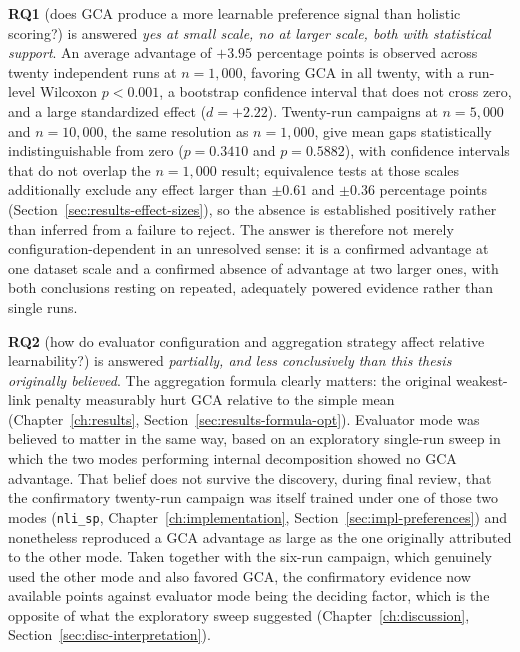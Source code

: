 \textbf{RQ1} (does GCA produce a more learnable preference signal than holistic
scoring?) is answered \emph{yes at small scale, no at larger scale, both with
statistical support}. An average advantage of $+3.95$ percentage points is
observed across twenty independent runs at $n=1{,}000$, favoring GCA in all
twenty, with a run-level Wilcoxon $p<0.001$, a bootstrap confidence interval
that does not cross zero, and a large standardized effect ($d=+2.22$).
Twenty-run campaigns at $n=5{,}000$ and $n=10{,}000$, the same resolution as
$n=1{,}000$, give mean gaps statistically indistinguishable from zero
($p=0.3410$ and $p=0.5882$), with confidence intervals that do not overlap the
$n=1{,}000$ result; equivalence tests at those scales additionally exclude any
effect larger than $\pm0.61$ and $\pm0.36$ percentage points
(Section~\ref{sec:results-effect-sizes}), so the absence is established
positively rather than inferred from a failure to reject. The answer is
therefore not merely configuration-dependent in an unresolved sense: it is a
confirmed advantage at one dataset scale and a confirmed absence of advantage at
two larger ones, with both conclusions resting on repeated, adequately powered
evidence rather than single runs.

\textbf{RQ2} (how do evaluator configuration and aggregation strategy affect
relative learnability?) is answered \emph{partially, and less conclusively
than this thesis originally believed}. The aggregation formula clearly
matters: the original weakest-link penalty measurably hurt GCA relative to
the simple mean (Chapter~\ref{ch:results}, Section~\ref{sec:results-formula-opt}).
Evaluator mode was believed to matter in the same way, based on an
exploratory single-run sweep in which the two modes performing internal
decomposition showed no GCA advantage. That belief does not survive the
discovery, during final review, that the confirmatory twenty-run campaign
was itself trained under one of those two modes
(\texttt{nli\_sp}, Chapter~\ref{ch:implementation},
Section~\ref{sec:impl-preferences}) and nonetheless reproduced a GCA
advantage as large as the one originally attributed to the other mode.
Taken together with the six-run campaign, which genuinely used the other
mode and also favored GCA, the confirmatory evidence now available points
against evaluator mode being the deciding factor, which is the opposite of
what the exploratory sweep suggested
(Chapter~\ref{ch:discussion}, Section~\ref{sec:disc-interpretation}).

